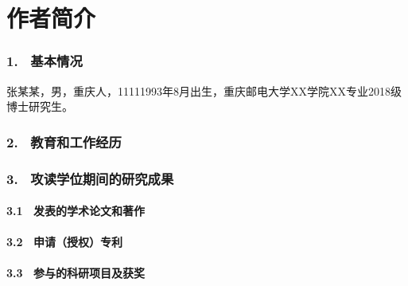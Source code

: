 \specialsectioning


\chapter{作者简介}
\thispagestyle{others}

\subsection{1. \ 基本情况}
张某某，男，重庆人，11111993年8月出生，重庆邮电大学XX学院XX专业2018级博士研究生。

\subsection{2. \ 教育和工作经历}

\subsection{3. \ 攻读学位期间的研究成果}

\subsubsection{3.1 \ 发表的学术论文和著作}

\subsubsection{3.2 \ 申请（授权）专利}

\subsubsection{3.3 \ 参与的科研项目及获奖}


